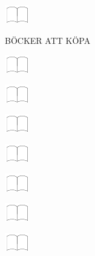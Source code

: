 \documentclass[11pt,titlepage]{article}
\begin{document}
\vspace{12mm}

\noindent
\includegraphics[]{book.pdf}

\pagebreak

\small
\hfill BÖCKER ATT KÖPA

\vspace{6mm}

\noindent
\includegraphics[]{book.pdf}

\vspace{12mm}

\noindent
\includegraphics[]{book.pdf}

\vspace{12mm}

\noindent
\includegraphics[]{book.pdf}

\vspace{12mm}

\noindent
\includegraphics[]{book.pdf}

\vspace{12mm}

\noindent
\includegraphics[]{book.pdf}

\vspace{12mm}

\noindent
\includegraphics[]{book.pdf}

\vspace{12mm}

\noindent
\includegraphics[]{book.pdf}
\end{document}
